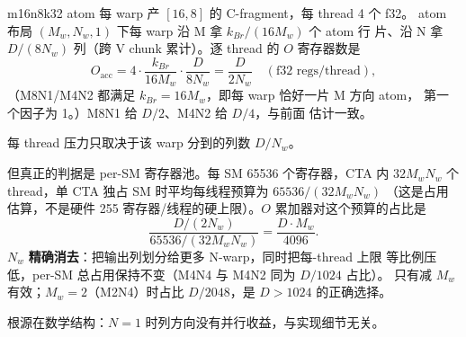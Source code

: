 m16n8k32 atom 每 warp 产 $[16,8]$ 的 C-fragment，每 thread 4 个 f32。
atom 布局 $(M_w,N_w,1)$ 下每 warp 沿 M 拿 $k_{Br}/(16M_w)$ 个 atom 行
片、沿 N 拿 $D/(8N_w)$ 列（跨 V chunk 累计）。逐 thread 的 $O$
寄存器数是
\begin{equation}\label{eq:30-regthread}
O_{\text{acc}}
=4\cdot\frac{k_{Br}}{16M_w}\cdot\frac{D}{8N_w}
=\frac{D}{2N_w}\quad(\text{f32 regs/thread}),
\end{equation}
（M8N1/M4N2 都满足 $k_{Br}=16M_w$，即每 warp 恰好一片 M 方向 atom，
第一个因子为 1。）M8N1 给 $D/2$、M4N2 给 $D/4$，与前面
估计一致。

每 thread 压力只取决于该 warp 分到的列数 $D/N_w$。

但真正的判据是 per-SM 寄存器池。每 SM 65536 个寄存器，CTA 内
$32M_wN_w$ 个 thread，单 CTA 独占 SM 时平均每线程预算为 $65536/(32M_wN_w)$
（这是占用估算，不是硬件 255 寄存器/线程的硬上限）。$O$ 累加器对这个预算的占比是
\begin{equation}\label{eq:30-smpool}
\frac{D/(2N_w)}{65536/(32M_wN_w)}=\frac{D\cdot M_w}{4096}.
\end{equation}
$N_w$ \textbf{精确消去}：把输出列划分给更多 N-warp，同时把每-thread 上限
等比例压低，per-SM 总占用保持不变（M4N4 与 M4N2 同为 $D/1024$ 占比）。
只有减 $M_w$ 有效；$M_w=2$（M2N4）时占比 $D/2048$，是 $D>1024$ 的正确选择。

根源在数学结构：$N=1$ 时列方向没有并行收益，与实现细节无关。


